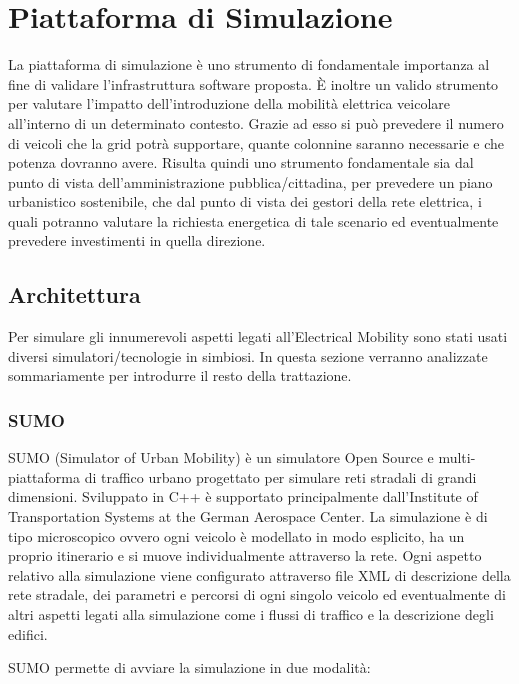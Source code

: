 \chapter{Piattaforma di Simulazione}\label{chap:sim}

La piattaforma di simulazione è uno strumento di fondamentale importanza al fine di validare l'infrastruttura software proposta. È inoltre un valido strumento per valutare l'impatto dell'introduzione della mobilità elettrica veicolare all'interno di un determinato contesto. Grazie ad esso si può prevedere il numero di veicoli che la grid potrà supportare, quante colonnine saranno necessarie e che potenza dovranno avere. Risulta quindi uno strumento fondamentale sia dal punto di vista dell'amministrazione pubblica/cittadina, per prevedere un piano urbanistico sostenibile, che dal punto di vista dei gestori della rete elettrica, i quali potranno valutare la richiesta energetica di tale scenario ed eventualmente prevedere investimenti in quella direzione.

\section{Architettura}

Per simulare gli innumerevoli aspetti legati all'Electrical Mobility sono stati usati diversi simulatori/tecnologie in simbiosi. In questa sezione verranno analizzate sommariamente per introdurre il resto della trattazione.

\subsection{SUMO}\label{sebsec:sumo}

SUMO (Simulator of Urban Mobility) è un simulatore Open Source e multi-piattaforma di traffico urbano progettato per simulare reti stradali di grandi dimensioni. Sviluppato in C++ è supportato principalmente dall'Institute of Transportation Systems at the German Aerospace Center. La simulazione è di tipo microscopico ovvero ogni veicolo è modellato in modo esplicito, ha un proprio itinerario e si muove individualmente attraverso la rete. Ogni aspetto relativo alla simulazione viene configurato attraverso file XML di descrizione della rete stradale, dei parametri e percorsi di ogni singolo veicolo ed eventualmente di altri aspetti legati alla simulazione come i flussi di traffico e la descrizione degli edifici. 

SUMO permette di avviare la simulazione in due modalità:

